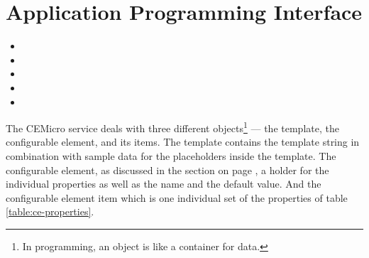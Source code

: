 \section{Application Programming Interface}
\label{sec:impl:api}

\begin{itemize}
  \item {}
  \item {}
  \item {}
  \item {}
  \item {}
\end{itemize}

The CEMicro service deals with three different objects\footnote{In programming, an object is like a container for data.} — the template, the configurable element, and its items. The template contains the template string in combination with sample data for the placeholders inside the template. The configurable element, as discussed in the section on page \pageref{sec:arch:understanding}, a holder for the individual properties as well as the name and the default value. And the configurable element item which is one individual set of the properties of table \ref{table:ce-properties}.

